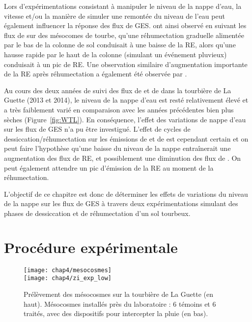 Lors d'expérimentations consistant à manipuler le niveau de la nappe d'eau, la vitesse et/ou la manière de simuler une remontée du niveau de l'eau peut également influencer la réponse des flux de GES.
\citet{strack2009} ont ainsi observé en suivant les flux de \coo sur des mésocomes de tourbe, qu'une réhumectation graduelle alimentée par le bas de la colonne de sol conduisait à une baisse de la RE, alors qu'une hausse rapide par le haut de la colonne (simulant un événement pluvieux) conduisait à un pic de RE.
Une observation similaire d'augmentation importante de la RE après réhumectation a également été observée par  \citet{mcneil2003}.


Au cours des deux années de suivi des flux de \coo et de \chh dans la tourbière de La Guette (2013 et 2014), le niveau de la nappe d'eau est resté relativement élevé et a très faiblement varié en comparaison avec les années précédentes bien plus sèches (Figure~\ref{fig:WTL}).
En conséquence, l'effet des variations de nappe d'eau sur les flux de GES n'a pu être investigué.
L'effet de cycles de dessiccation/réhumectation sur les émissions de \coo et de \chh est cependant certain et on peut faire l'hypothèse qu'une baisse du niveau de la nappe entraînerait une augmentation des flux de RE, et possiblement une diminution des flux de \chh.
On peut également attendre un pic d'émission de la RE au moment de la réhumectation.

L'objectif de ce chapitre est donc de déterminer les effets de variations du niveau de la nappe sur les flux de GES à travers deux expérimentations simulant des phases de dessiccation et de réhumectation d'un sol tourbeux.

\section{Procédure expérimentale}

\begin{figure}
\centering
\texttt{[image: chap4/mesocosmes]}\\
\texttt{[image: chap4/zi\_exp\_low]}
\caption{Prélèvement des mésocosmes sur la tourbière de La Guette (en haut). Mésocosmes installés près du laboratoire : 6 témoins et 6 traités, avec des dispositifs pour intercepter la pluie (en bas).}
\label{fig:mesophoto}
\end{figure}


